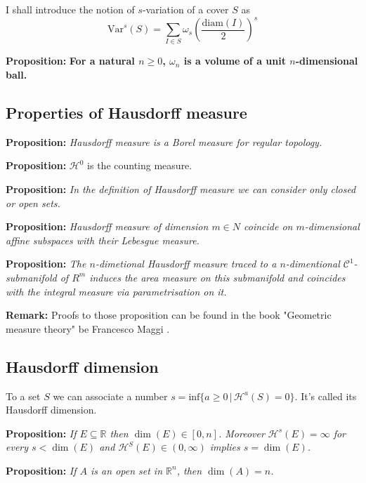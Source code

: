 \documentclass{article}
\begin{document}
I shall introduce the notion of $s$-variation of a cover $S$ as
\[\text{Var}^s(S)=\sum_{I\in S}\omega_s\left(\frac{\text{diam}(I)}{2}\right)^s\]

\textbf{Proposition:} \textbf{For a natural $n\geq 0$, $\omega_n$ is a volume of a unit
$n$-dimensional ball.}
\vspace{1ex}

\subsection{Properties of Hausdorff measure}

\textbf{Proposition:} \textit{Hausdorff measure is a Borel measure for regular topology.}

\vspace{2ex}
\textbf{Proposition:} $\mathcal H^0$ is the counting measure.

\vspace{2ex}
\textbf{Proposition:} \textit{In the definition of Hausdorff measure we can consider
only closed or open sets.}

\vspace{2ex}
\textbf{Proposition:} \textit{Hausdorff measure of dimension $m\in N$ coincide on
$m$-dimensional affine subspaces with their Lebesgue measure.}

\vspace{2ex}
\textbf{Proposition:} \textit{The $n$-dimetional Hausdorff measure traced to a
$n$-dimentional $\mathcal{C}^1$-submanifold of $R^m$ induces the area measure
on this submanifold and coincides with the integral measure via parametrisation
on it.}

\vspace{1ex}
\textbf{Remark:} Proofs to those proposition can be found in the book "Geometric
measure theory" be Francesco Maggi \cite{maggi}.
\subsection{Hausdorff dimension}

To a set $S$ we can associate a number $s=\text{inf}\{a\geq 0\,|\,\mathcal{H}^a
(S)=0\}$. It's called its Hausdorff dimension.

\vspace{2ex}
\textbf{Proposition:} \textit{If $E\subseteq\mathbb R$ then $\dim(E)\in [0, n]$.
Moreover $\mathcal H^s(E)=\infty$ for every $s<\dim(E)$ and $\mathcal H^S(E)\in
(0,\infty)$ implies $s=\dim(E)$.}

\vspace{2ex}
\textbf{Proposition:} \textit{If $A$ is an open set in $\mathbb R^n$, then $\dim
(A) = n$.}
\end{document}
